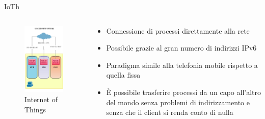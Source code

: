 \documentclass{beamer}
\begin{document}
\begin{frame}[fragile]{IoTh}
	\begin{columns}[T]
	\begin{column}{.40\textwidth}
	    \begin{figure}[t!]
	    \includegraphics[scale=0.35]{img/new_stack.png}
	    \caption{Internet of Things}
	    \centering

	\end{figure}
	\end{column}%
	\hfill%
	\begin{column}{.60\textwidth}
	\newline
	\begin{itemize}
	    \item Connessione di processi direttamente alla rete\newline
			\item Possibile grazie al gran numero di indirizzi IPv6\newline
			\item Paradigma simile alla telefonia mobile rispetto a quella fissa\newline
			\item \`E possibile trasferire processi da un capo all'altro del mondo senza problemi di indirizzamento e senza che il client si renda conto di nulla\newline
	\end{itemize}

	\end{column}%
	\end{columns}
\end{frame}
\end{document}

